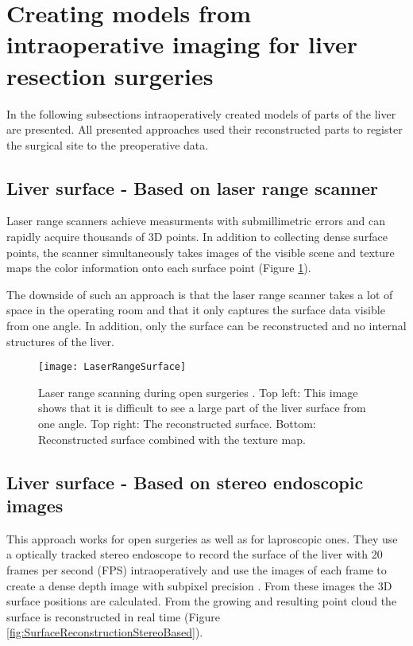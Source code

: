 \section{Creating models from intraoperative imaging for liver resection
  surgeries}
In the following subsections intraoperatively created models of parts of the
liver are presented. All presented approaches used their reconstructed parts to
register the surgical site to the preoperative data.


\subsection{Liver surface - Based on laser range scanner}
Laser range scanners achieve measurments with submillimetric errors and can rapidly
acquire thousands of 3D points. In addition to collecting dense surface points,
the scanner simultaneously takes images of the visible scene and texture maps
the color information onto each surface point (Figure \ref{fig:LaserRangeSurface}). 

The downside of such an approach is that the laser range scanner takes a lot of
space in the operating room and that it only captures the surface data visible
from one angle. In addition, only the surface can be reconstructed and no
internal structures of the liver.
\begin{figure}[H]
  \centering
 \texttt{[image: LaserRangeSurface]}
 \caption{Laser range scanning during open surgeries \cite{cash2007concepts}.
   Top left: This image shows that it is difficult to see a large part of the liver
   surface from one angle. Top right: The reconstructed surface. Bottom:
   Reconstructed surface combined with the texture map. }
  \label{fig:LaserRangeSurface}
\end{figure}

\subsection{Liver surface - Based on stereo endoscopic images}
This approach works for open surgeries as well as for laproscopic ones. They use
a optically tracked stereo endoscope to record the surface of the liver with 20
frames per second (FPS) intraoperatively and use
the images of each frame to create a dense depth image with subpixel precision \cite{speidel2011intraoperative}.
From these images the 3D surface positions are calculated. From the growing and resulting
point cloud the surface is reconstructed in real time (Figure \ref{fig:SurfaceReconstructionStereoBased}).

